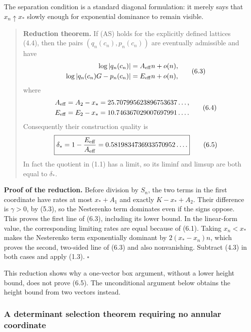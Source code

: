 \documentclass[
  11pt,
]{article}
\begin{document}
The separation condition is a standard diagonal formulation: it merely
says that \(x_n\uparrow x_*\) slowly enough for exponential dominance to
remain visible.

\begin{quote}
\textbf{Reduction theorem.} If (AS) holds for the explicitly defined
lattices (4.4), then the pairs \((q_n(c_n),p_n(c_n))\) are eventually
admissible and have \[
\begin{aligned}
\log|q_n(c_n)|&=A_{\rm eff}n+o(n),\\
\log|q_n(c_n)G-p_n(c_n)|&=E_{\rm eff}n+o(n),
\end{aligned}                                      \tag{6.3}
\] where \[
\begin{aligned}
A_{\rm eff}&=A_2-x_*=25.707995623896753637\ldots,\\
E_{\rm eff}&=E_2-x_*=10.746367029007697991\ldots.
\end{aligned}                                      \tag{6.4}
\] Consequently their construction quality is \[
\boxed{\delta_*=1-\frac{E_{\rm eff}}{A_{\rm eff}}
=0.5819834736933570952\ldots.}                     \tag{6.5}
\] In fact the quotient in (1.1) has a limit, so its liminf and limsup
are both equal to \(\delta_*\).
\end{quote}

\textbf{Proof of the reduction.} Before division by \(S_n\), the two
terms in the first coordinate have rates at most \(x_*+A_1\) and exactly
\(K-x_*+A_2\). Their difference is \(\gamma>0\), by (5.3), so the
Nesterenko term dominates even if the signs oppose. This proves the
first line of (6.3), including its lower bound. In the linear-form
value, the corresponding limiting rates are equal because of (6.1).
Taking \(x_n<x_*\) makes the Nesterenko term exponentially dominant by
\(2(x_*-x_n)n\), which proves the second, two-sided line of (6.3) and
also nonvanishing. Subtract (4.3) in both cases and apply (1.3).
\(\square\)

This reduction shows why a one-vector box argument, without a lower
height bound, does not prove (6.5). The unconditional argument below
obtains the height bound from two vectors instead.

\hypertarget{a-determinant-selection-theorem-requiring-no-annular-coordinate}{%
\subsubsection{A determinant selection theorem requiring no annular
coordinate}\label{a-determinant-selection-theorem-requiring-no-annular-coordinate}}
\end{document}
